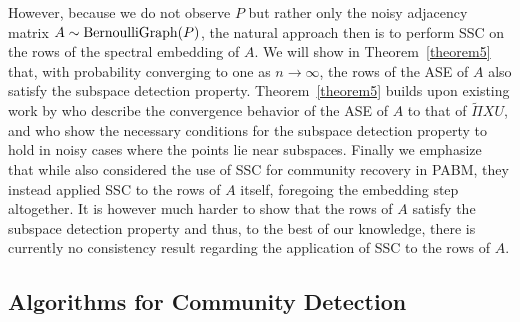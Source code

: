 \documentclass[12pt]{article}
\begin{document}
However, because we do not observe $P$ but rather only the noisy
adjacency matrix $A \sim \mathrm{BernoulliGraph}(P)$, the natural approach then is
to perform SSC on the rows of the spectral embedding of \(A\). We will
show in Theorem~\ref{theorem5} that, with probability converging to
one as $n \rightarrow \infty$, the rows of the ASE of $A$ also
satisfy the subspace detection property. 
Theorem~\ref{theorem5} builds upon existing work by
\citet{rubindelanchy2017statistical} who describe the convergence
behavior of the ASE of \(A\) to that of \(\tilde{\Pi} XU\), and
\citet{jmlr-v28-wang13} who show the necessary conditions for the
subspace detection property to hold in noisy cases where the points lie
near subspaces. Finally we emphasize that while
\citet{noroozi2019estimation} also considered the use of SSC for
community recovery in PABM, they instead applied SSC to the rows of
\(A\) itself, foregoing
the embedding step altogether. It is however much harder to show that
the rows of $A$ satisfy the subspace detection property and thus, to
the best of our knowledge, there is currently no consistency result
regarding the application of SSC to the rows of $A$. 

\hypertarget{community-detection}{%
\subsection{Algorithms for Community Detection}\label{community-detection}}
\end{document}
